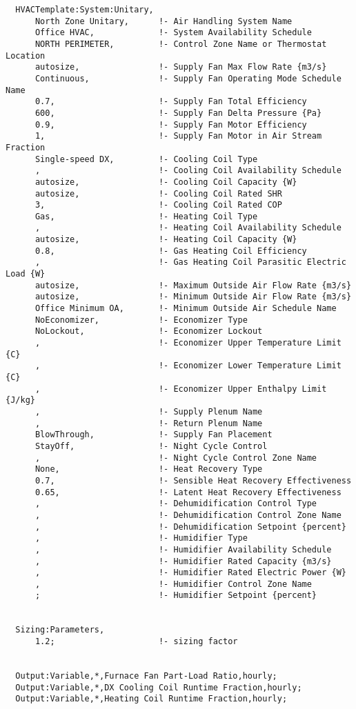 \begin{lstlisting}
  HVACTemplate:System:Unitary,
      North Zone Unitary,      !- Air Handling System Name
      Office HVAC,             !- System Availability Schedule
      NORTH PERIMETER,         !- Control Zone Name or Thermostat Location
      autosize,                !- Supply Fan Max Flow Rate {m3/s}
      Continuous,              !- Supply Fan Operating Mode Schedule Name
      0.7,                     !- Supply Fan Total Efficiency
      600,                     !- Supply Fan Delta Pressure {Pa}
      0.9,                     !- Supply Fan Motor Efficiency
      1,                       !- Supply Fan Motor in Air Stream Fraction
      Single-speed DX,         !- Cooling Coil Type
      ,                        !- Cooling Coil Availability Schedule
      autosize,                !- Cooling Coil Capacity {W}
      autosize,                !- Cooling Coil Rated SHR
      3,                       !- Cooling Coil Rated COP
      Gas,                     !- Heating Coil Type
      ,                        !- Heating Coil Availability Schedule
      autosize,                !- Heating Coil Capacity {W}
      0.8,                     !- Gas Heating Coil Efficiency
      ,                        !- Gas Heating Coil Parasitic Electric Load {W}
      autosize,                !- Maximum Outside Air Flow Rate {m3/s}
      autosize,                !- Minimum Outside Air Flow Rate {m3/s}
      Office Minimum OA,       !- Minimum Outside Air Schedule Name
      NoEconomizer,            !- Economizer Type
      NoLockout,               !- Economizer Lockout
      ,                        !- Economizer Upper Temperature Limit {C}
      ,                        !- Economizer Lower Temperature Limit {C}
      ,                        !- Economizer Upper Enthalpy Limit {J/kg}
      ,                        !- Supply Plenum Name
      ,                        !- Return Plenum Name
      BlowThrough,             !- Supply Fan Placement
      StayOff,                 !- Night Cycle Control
      ,                        !- Night Cycle Control Zone Name
      None,                    !- Heat Recovery Type
      0.7,                     !- Sensible Heat Recovery Effectiveness
      0.65,                    !- Latent Heat Recovery Effectiveness
      ,                        !- Dehumidification Control Type
      ,                        !- Dehumidification Control Zone Name
      ,                        !- Dehumidification Setpoint {percent}
      ,                        !- Humidifier Type
      ,                        !- Humidifier Availability Schedule
      ,                        !- Humidifier Rated Capacity {m3/s}
      ,                        !- Humidifier Rated Electric Power {W}
      ,                        !- Humidifier Control Zone Name
      ;                        !- Humidifier Setpoint {percent}


  Sizing:Parameters,
      1.2;                     !- sizing factor


  Output:Variable,*,Furnace Fan Part-Load Ratio,hourly;
  Output:Variable,*,DX Cooling Coil Runtime Fraction,hourly;
  Output:Variable,*,Heating Coil Runtime Fraction,hourly;
\end{lstlisting}

